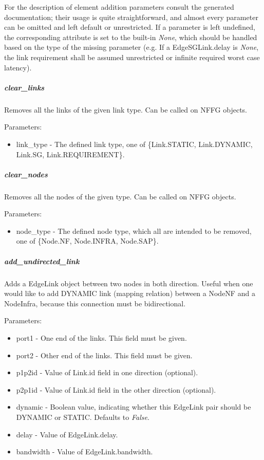 \documentclass[a4paper,10pt]{scrartcl}
\begin{document}
For the description of element addition parameters consult the generated documentation; 
their usage is quite straightforward, and almost every parameter can be omitted and left default or unrestricted.
If a parameter is left undefined, the corresponding attribute is set to the built-in \emph{None}, 
which should be handled based on the type of the missing parameter (e.g. If a EdgeSGLink.delay is \emph{None}, 
the link requirement shall be assumed unrestricted or infinite required worst case latency).

\subparagraph{clear\_links}
Removes all the links of the given link type. Can be called on NFFG objects.

Parameters:
\begin{itemize}
\item link\_type - The defined link type, one of \{Link.STATIC, Link.DYNAMIC, Link.SG, Link.REQUIREMENT\}.
\end{itemize}

\subparagraph{clear\_nodes}
Removes all the nodes of the given type. Can be called on NFFG objects.

Parameters:
\begin{itemize}
\item node\_type - The defined node type, which all are intended to be removed, one of \{Node.NF, Node.INFRA, Node.SAP\}.
\end{itemize}

\subparagraph{add\_undirected\_link}
Adds a EdgeLink object between two nodes in both direction. Useful when one would like to add DYNAMIC link 
(mapping relation) between a NodeNF and a NodeInfra, because this connection must be bidirectional.

Parameters:
\begin{itemize}
\item port1 - One end of the links. This field must be given.
\item port2 - Other end of the links. This field must be given.
\item p1p2id - Value of Link.id field in one direction (optional).
\item p2p1id - Value of Link.id field in the other direction (optional).
\item dynamic - Boolean value, indicating whether this EdgeLink pair should be DYNAMIC or STATIC. Defaults to \emph{False}.
\item delay - Value of EdgeLink.delay.
\item bandwidth - Value of EdgeLink.bandwidth.
\end{itemize}
\end{document}

